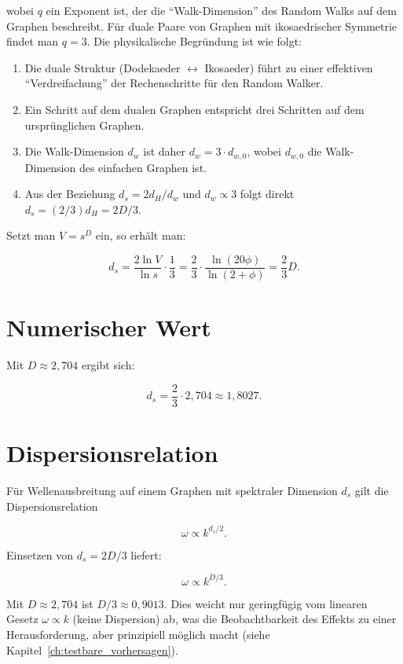 wobei \(q\) ein Exponent ist, der die \enquote{Walk-Dimension} des Random Walks auf dem Graphen beschreibt. Für duale Paare von Graphen mit ikosaedrischer Symmetrie findet man \(q = 3\). Die physikalische Begründung ist wie folgt:

\begin{enumerate}
    \item Die duale Struktur (Dodekaeder \(\leftrightarrow\) Ikosaeder) führt zu einer effektiven \enquote{Verdreifachung} der Rechenschritte für den Random Walker.
    \item Ein Schritt auf dem dualen Graphen entspricht drei Schritten auf dem ursprünglichen Graphen.
    \item Die Walk-Dimension \(d_w\) ist daher \(d_w = 3 \cdot d_{w,0}\), wobei \(d_{w,0}\) die Walk-Dimension des einfachen Graphen ist.
    \item Aus der Beziehung \(d_s = 2d_H/d_w\) und \(d_w \propto 3\) folgt direkt \(d_s = (2/3)d_H = 2D/3\).
\end{enumerate}

Setzt man \(V = s^D\) ein, so erhält man:

\[
d_s = \frac{2\ln V}{\ln s} \cdot \frac{1}{3}
    = \frac{2}{3} \cdot \frac{\ln(20\phi)}{\ln(2+\phi)}
    = \frac{2}{3} D.
\]

\section{Numerischer Wert}
\label{app:spektrale_numerisch}

Mit \(D \approx 2,704\) ergibt sich:

\[
d_s = \frac{2}{3} \cdot 2,704 \approx 1,8027.
\]

\section{Dispersionsrelation}
\label{app:spektrale_dispersion}

Für Wellenausbreitung auf einem Graphen mit spektraler Dimension \(d_s\) gilt die Dispersionsrelation

\[
\omega \propto k^{d_s/2}.
\]

Einsetzen von \(d_s = 2D/3\) liefert:

\[
\omega \propto k^{D/3}.
\]

Mit \(D \approx 2,704\) ist \(D/3 \approx 0,9013\). Dies weicht nur geringfügig vom linearen Gesetz \(\omega \propto k\) (keine Dispersion) ab, was die Beobachtbarkeit des Effekts zu einer Herausforderung, aber prinzipiell möglich macht (siehe Kapitel~\ref{ch:testbare_vorhersagen}).

